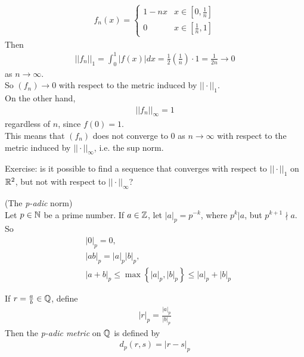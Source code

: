 \documentclass[a4paper]{article}
\begin{document}
\begin{eg}
\begin{equation*}
\begin{aligned}
f_n\left(x\right) = \left\{ 
\begin{array}{ll}
1-nx & x\in\left[0,\frac{1}{n}\right]\\
0 & x\in\left[\frac{1}{n},1\right]
\end{array}
\right.
\end{aligned}
\end{equation*}
Then
\begin{equation*}
\begin{aligned}
||f_n||_1 = \int_0^1 |f\left(x\right)| dx = \frac{1}{2}\left(\frac{1}{n}\right)\cdot 1 = \frac{1}{2n} \to 0
\end{aligned}
\end{equation*}
as $n\to \infty$.\\
So $\left(f_n\right) \to 0$ with respect to the metric induced by $|| \cdot ||_1$.\\
On the other hand,
\begin{equation*}
\begin{aligned}
||f_n||_\infty = 1
\end{aligned}
\end{equation*}
regardless of $n$, since $f\left(0\right)=1$.\\
This means that $\left(f_n\right)$ does not converge to 0 as $n\to \infty$ with respect to the metric induced by $||\cdot||_\infty$, i.e. the sup norm.
\end{eg}

Exercise: is it possible to find a sequence that converges with respect to $||\cdot||_1$ on $\mathbb{R}^2$, but not with respect to $||\cdot||_\infty$?

\begin{eg} (The \emph{p-adic} norm)\\
Let $p \in \mathbb{N}$ be a prime number. If $a \in \mathbb{Z}$, let $|a|_p = p^{-k}$, where $p^k | a$, but $p^{k+1} \nmid a$.\\
So
\begin{equation*}
\begin{aligned}
&|0|_p = 0,\\
&|ab|_p = |a|_p |b|_p,\\
&|a+b|_p \leq \max\left\{|a|_p, |b|_p\right\} \leq |a|_p + |b|_p
\end{aligned}
\end{equation*}

If $r=\frac{a}{b} \in \mathbb{Q}$, define
\begin{equation*}
\begin{aligned}
|r|_p  = \frac{|a|_p}{|b|_p}
\end{aligned}
\end{equation*}
Then the \emph{p-adic metric} on $\mathbb{Q}$ is defined by
\begin{equation*}
\begin{aligned}
d_p \left(r,s\right) = |r-s|_p
\end{aligned}
\end{equation*}
\end{eg}
\end{document}
